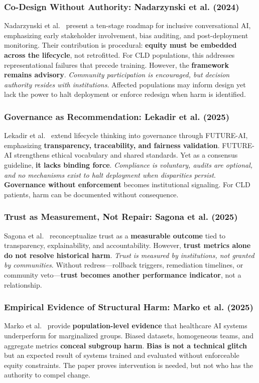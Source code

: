 \documentclass[12pt,a4paper]{article}
\begin{document}
\subsubsection{Co-Design Without Authority: Nadarzynski et al. (2024)}
Nadarzynski et al.\ \citep{Nadarzynski2024} present a ten-stage roadmap for inclusive conversational AI, emphasizing early stakeholder involvement, bias auditing, and post-deployment monitoring. Their contribution is procedural: \textbf{equity must be embedded across the lifecycle}, not retrofitted. For CLD populations, this addresses representational failures that precede training. However, the \textbf{framework remains advisory}. \textit{Community participation is encouraged, but decision authority resides with institutions}. Affected populations may inform design yet lack the power to halt deployment or enforce redesign when harm is identified.

\subsubsection{Governance as Recommendation: Lekadir et al. (2025)}
Lekadir et al.\ \citep{Lekadir2025} extend lifecycle thinking into governance through FUTURE-AI, emphasizing \textbf{transparency, traceability, and fairness validation}. FUTURE-AI strengthens ethical vocabulary and shared standards. Yet as a consensus guideline, \textbf{it lacks binding force}. \textit{Compliance is voluntary, audits are optional, and no mechanisms exist to halt deployment when disparities persist}. \textbf{Governance without enforcement} becomes institutional signaling. For CLD patients, harm can be documented without consequence.

\subsubsection{Trust as Measurement, Not Repair: Sagona et al. (2025)}
Sagona et al.\ \citep{Sagona2025} reconceptualize trust as a \textbf{measurable outcome} tied to transparency, explainability, and accountability. However, \textbf{trust metrics alone do not resolve historical harm}. \textit{Trust is measured by institutions, not granted by communities}. Without redress—rollback triggers, remediation timelines, or community veto—\textbf{trust becomes another performance indicator}, not a relationship.

\subsubsection{Empirical Evidence of Structural Harm: Marko et al. (2025)}
Marko et al.\ \citep{Marko2025} provide \textbf{population-level evidence} that healthcare AI systems underperform for marginalized groups. Biased datasets, homogeneous teams, and aggregate metrics \textbf{conceal subgroup harm}. \textbf{Bias is not a technical glitch} but an expected result of systems trained and evaluated without enforceable equity constraints. The paper proves intervention is needed, but not who has the authority to compel change.
\end{document}
